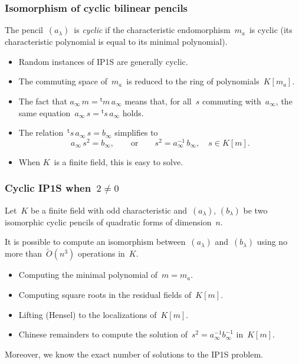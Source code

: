 \documentclass{beamer}%
\def\transpose{{}^{\mathrm{\scriptscriptstyle t}}\!}
\def\emphz#1{\emph{{\color{bleu}#1}}}
\let\mathrm\mathsf
\begin{document}
\begin{frame}\frametitle{Isomorphism of cyclic bilinear pencils}%
The pencil~$(a_{λ})$~is \emphz{cyclic} if the characteristic
endomorphism~$m_{a}$~is cyclic (its characteristic polynomial is equal to
its minimal polynomial).
\begin{itemize}
\item Random instances of IP1S are generally cyclic.
\item The commuting space of~$m_{a}$~is reduced to the ring of
polynomials~$K[m_a]$.
\item The fact that $a_{∞}\, m = \transpose{m}\, a_{∞}$ means that, for
all~$s$ commuting with~$a_{∞}$, the same equation~$a_{∞}\, s =
\transpose{s}\, a_{∞}$ holds.
\item The relation~$\transpose{s}\, a_{∞}\, s = b_{∞}$ simplifies to
\begin{equation*}
a_{∞}\, s^2 = b_{∞}, \qquad \text{or}\qquad s^2 = a_{∞}^{-1}\, b_{∞},
\quad s ∈ K[m].
\end{equation*}
\item When $K$~is a finite field, this is easy to solve.
\end{itemize}
\end{frame}%
\begin{frame}\frametitle{Cyclic IP1S when~$2 ≠ 0$}%
\begin{theorem}
Let~$K$ be a finite field with odd characteristic and~$(a_{λ})$,
$(b_{λ})$ be two isomorphic cyclic pencils of quadratic forms of
dimension~$n$.

It is possible to compute an isomorphism between~$(a_{λ})$ and~$(b_{λ})$
using no more than~$\widetilde O(n^3)$ operations in~$K$.
\end{theorem}
\begin{itemize}
\item Computing the minimal polynomial of~$m = m_a$.
\item Computing square roots in the residual fields of~$K[m]$.
\item Lifting (Hensel) to the localizations of~$K[m]$.
\item Chinese remainders to compute the solution of~$s^2 = a_{∞}^{-1}
b_{∞}^{-1}$ in~$K[m]$.
\end{itemize}
Moreover, we know the exact number of solutions to the IP1S problem.
\end{frame}%
\end{document}
